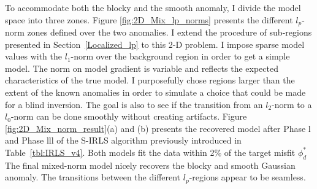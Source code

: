 To accommodate both the blocky and the smooth anomaly, I divide the model space into three zones.
Figure \ref{fig:2D_Mix_lp_norms} presents the different $l_p$-norm zones defined over the two anomalies.
I extend the procedure of sub-regions presented in Section~\ref{Localized_lp} to this 2-D problem.
I impose sparse model values with the $l_1$-norm over the background region in order to get a simple model.
The norm on model gradient is variable and reflects the expected characteristics of the true model.   
I purposefully chose regions larger than the extent of the known anomalies in order to simulate a choice that could be made for a blind inversion. The goal is also to see if the transition from an $l_2$-norm to a $l_0$-norm can be done smoothly without creating artifacts.
Figure \ref{fig:2D_Mix_norm_result}(a) and (b) presents the recovered model after Phase l and Phase lll of the S-IRLS algorithm previously introduced in Table~\ref{tbl:IRLS_v4}.
Both models fit the data within 2\% of the target misfit $\phi_d^*$
The final mixed-norm model nicely recovers the blocky and smooth Gaussian anomaly. The transitions between the different $l_p$-regions appear to be seamless.

